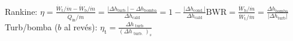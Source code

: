 \begin{formuleo}
Rankine: $\eta=\frac{\dot{W}_{\mathrm{t}} / \dot{m}-\dot{W}_{\mathrm{b}} / \dot{m}}{\dot{Q}_{\mathrm{in}} / \dot{m}}=\frac{\left|\Delta h_{\mathrm{turb} .}\right|-\Delta h_{\mathrm{bomba}}}{\Delta h_{\mathrm{cald}}}=1-\frac{\left|\Delta h_{\mathrm{cond} .}\right|}{\Delta h_{\mathrm{cald}}}$\separar $\mathrm{BWR}=\frac{\dot{W}_{\mathrm{b}} / \dot{m}}{\dot{W}_{\mathrm{t}} / \dot{m}}=\frac{\Delta h_{\mathrm{bomba}}}{ | \Delta h_{\mathrm{turb}} |}$ \separar Turb/bomba ($b$ al revés): $\eta_{\mathrm{t}}=\frac{\Delta h_{\text { turb }}}{\left(\Delta h_{\text { turb. }}\right)_{s}}$

\end{formuleo}
\vspace{\formuleoseparator}

